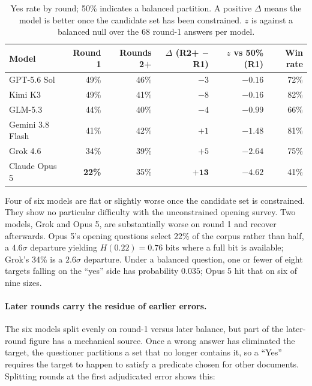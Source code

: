 \documentclass[11pt]{article}
\begin{document}
\begin{table}[h]
\centering\small
\begin{tabular}{lrrrrr}
\toprule
Model & Round 1 & Rounds 2+ & $\Delta$ (R2+ $-$ R1) & $z$ vs 50\% (R1) & Win rate \\
\midrule
GPT-5.6 Sol      & 49\% & 46\% & $-3$ & $-0.16$ & 72\% \\
Kimi K3          & 49\% & 41\% & $-8$ & $-0.16$ & 82\% \\
GLM-5.3          & 44\% & 40\% & $-4$ & $-0.99$ & 66\% \\
Gemini 3.8 Flash & 41\% & 42\% & $+1$ & $-1.48$ & 81\% \\
Grok 4.6         & 34\% & 39\% & $+5$ & $-2.64$ & 75\% \\
Claude Opus 5    & \textbf{22\%} & 35\% & $\mathbf{+13}$ & $\mathbf{-4.62}$ & 41\% \\
\bottomrule
\end{tabular}
\caption{Yes rate by round; 50\% indicates a balanced partition. A positive $\Delta$ means the model is
better once the candidate set has been constrained. $z$ is against a balanced null over the 68
round-1 answers per model.}
\end{table}

Four of six models are flat or slightly worse once the candidate set is
constrained. They show no particular difficulty with the unconstrained opening
survey. Two models, Grok and Opus 5, are substantially worse on round 1 and
recover afterwards. Opus 5's opening questions select 22\% of the corpus rather than
half, a $4.6\sigma$ departure yielding $H(0.22)=0.76$ bits where a full bit is
available; Grok's 34\% is a $2.6\sigma$ departure. Under a balanced question,
one or fewer of eight targets falling on the ``yes'' side has probability
$0.035$; Opus 5 hit that on six of nine sizes.

\paragraph{Later rounds carry the residue of earlier errors.} The six models
split evenly on round-1 versus later balance, but part of the later-round figure
has a mechanical source. Once a wrong answer has eliminated the target, the
questioner partitions a set that no longer contains it, so a ``Yes'' requires
the target to happen to satisfy a predicate chosen for other documents.
Splitting rounds at the first adjudicated error shows this:
\end{document}
